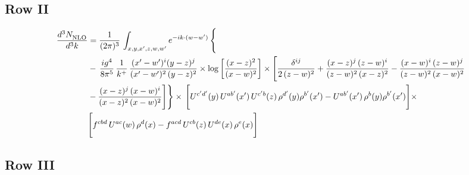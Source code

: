 \documentclass[9pt]{article}
\numberwithin{equation}{section}
\begin{document}
\subsection{Row II}
\begin{align}
     \frac{d^{3}N_{\rm NLO}^{\rm}}{d^{3}k}  & =   \frac{1}{(2\pi)^{3}}\, \int_{x,y,x',z,w,w^{\prime}} e^{-ik\cdot (w-w')}\, \Bigg\{\notag \\
& -\,\frac{ig^{4}}{8\pi^{5}}\,\frac{1}{k^{+}}\,\frac{(x'-w')^{i}(y-z)^{j}}{(x'-w')^{2}\,(y-z)^{2}}\times \log{\left[\frac{(x-z)^{2}}{(x-w)^{2}}\right]}\times \Bigg[\frac{\delta^{ij}}{2\,(z-w)^{2}}+\frac{(x-z)^{j}\,(z-w)^{i}}{(z-w)^{2}\,(x-z)^{2}} -\frac{(x-w)^{i}\,(z-w)^{j}}{(z-w)^{2}\,(x-w)^{2}}\notag \\ & -\frac{(x-z)^{j}\,(x-w)^{i}}{(x-z)^{2}\,(x-w)^{2}}\Bigg]\Bigg\}\times\,\Bigg[U^{c'd'}(y)\,U^{ab'}(x')\,U^{c'b}(z)\,\rho^{d'}(y)\rho^{b'}(x')-U^{ab'}(x')\,\rho^{b}(y)\rho^{b'}(x')\Bigg]\times\notag \\ & \Bigg[f^{cbd}\,U^{ac}(w)\,\rho^{d}(x)-f^{acd}\, U^{cb}(z)\,U^{de}(x)\,\rho^{e}(x)\Bigg]
\end{align}
 \subsection{Row III}
\end{document}
